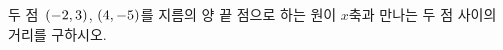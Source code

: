 두 점~$(-2{,}\mkern3mu\mathopen{}3)$, $(4{,}\mkern3mu\mathopen{}-5)$를 지름의 양 끝 점으로 하는 원이 \mbox{$x$축과} 만나는 두 점 사이의 거리를 구하시오.
